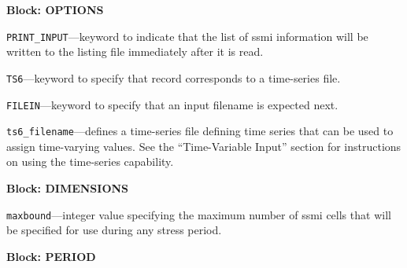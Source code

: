 
\item \textbf{Block: OPTIONS}

\begin{description}
\item \texttt{PRINT\_INPUT}---keyword to indicate that the list of ssmi information will be written to the listing file immediately after it is read.

\item \texttt{TS6}---keyword to specify that record corresponds to a time-series file.

\item \texttt{FILEIN}---keyword to specify that an input filename is expected next.

\item \texttt{ts6\_filename}---defines a time-series file defining time series that can be used to assign time-varying values. See the ``Time-Variable Input'' section for instructions on using the time-series capability.

\end{description}
\item \textbf{Block: DIMENSIONS}

\begin{description}
\item \texttt{maxbound}---integer value specifying the maximum number of ssmi cells that will be specified for use during any stress period.

\end{description}
\item \textbf{Block: PERIOD}

